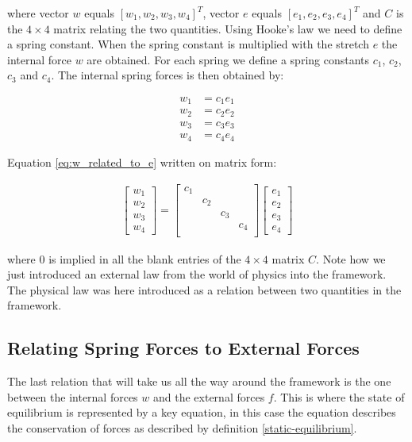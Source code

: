 where vector $w$ equals $[w_1, w_2, w_3, w_4]^T$, vector $e$ equals
$[e_1, e_2, e_3, e_4]^T$ and $C$ is the $4 \times 4$ matrix relating the two
quantities. Using Hooke's law we need to define a spring constant. When
the spring constant is multiplied with the stretch $e$ the internal
force $w$ are obtained. For each spring we define
a spring constants $c_1$, $c_2$, $c_3$ and $c_4$. The internal
spring forces is then obtained by:

\begin{align*}
w_1 &= c_1 e_1 \\
w_2 &= c_2 e_2 \\
w_3 &= c_3 e_3 \\
w_4 &= c_4 e_4
\end{align*}

Equation \eqref{eq:w_related_to_e} written on matrix form:

\begin{align}
\begin{bmatrix}
w_1 \\ w_2\\ w_3 \\ w_4
\end{bmatrix}
=
\begin{bmatrix}
c_1 &  &  &  \\
 & c_2 &  &  \\
 &  & c_3 &  \\
 &  &  & c_4 \\
\end{bmatrix}
\begin{bmatrix}
e_1 \\ e_2 \\ e_3 \\ e_4
\end{bmatrix}
\end{align}

where $0$ is implied in all the blank entries of the $4 \times 4$
matrix $C$. Note how we
just introduced an external law from the world of physics into the
framework. The physical law was here introduced as a relation between
two quantities in the framework. \\

\subsection{Relating Spring Forces to External Forces}
The last relation that will take us all the way around the framework
is the one between the internal 
forces $w$ and the external forces $f$. This is where the state of
equilibrium is represented by a key equation, in this case the equation
describes the conservation of forces as described by definition
\vref{static-equilibrium}.\\

